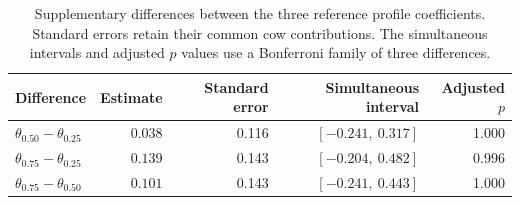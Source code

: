 \begin{table}[t]
\centering
\small
\caption{Supplementary differences between the three reference profile coefficients. Standard errors retain their common cow contributions. The simultaneous intervals and adjusted $p$ values use a Bonferroni family of three differences.}
\label{tab:milk-contrasts}
\begin{tabular}{lrrrr}
\toprule
Difference & Estimate & Standard error & Simultaneous interval & Adjusted $p$ \\
\midrule
$\theta_{0.50}-\theta_{0.25}$ & $0.038$ & 0.116 & $[-0.241,\ 0.317]$ & 1.000 \\
$\theta_{0.75}-\theta_{0.25}$ & $0.139$ & 0.143 & $[-0.204,\ 0.482]$ & 0.996 \\
$\theta_{0.75}-\theta_{0.50}$ & $0.101$ & 0.143 & $[-0.241,\ 0.443]$ & 1.000 \\
\bottomrule
\end{tabular}
\end{table}
